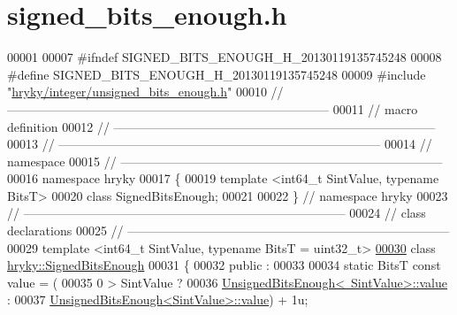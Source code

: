 \hypertarget{signed__bits__enough_8h_source}{\section{signed\-\_\-bits\-\_\-enough.\-h}
}

\begin{DoxyCode}
00001 
00007 \textcolor{preprocessor}{#ifndef SIGNED\_BITS\_ENOUGH\_H\_20130119135745248}
00008 \textcolor{preprocessor}{}\textcolor{preprocessor}{#define SIGNED\_BITS\_ENOUGH\_H\_20130119135745248}
00009 \textcolor{preprocessor}{}\textcolor{preprocessor}{#include "\hyperlink{unsigned__bits__enough_8h}{hryky/integer/unsigned_bits_enough.h}"}
00010 \textcolor{comment}{//
      ------------------------------------------------------------------------------}
00011 \textcolor{comment}{// macro definition}
00012 \textcolor{comment}{//
      ------------------------------------------------------------------------------}
00013 \textcolor{comment}{//
      ------------------------------------------------------------------------------}
00014 \textcolor{comment}{// namespace}
00015 \textcolor{comment}{//
      ------------------------------------------------------------------------------}
00016 \textcolor{keyword}{namespace }hryky
00017 \{
00019     \textcolor{keyword}{template} <\textcolor{keywordtype}{int}64\_t S\textcolor{keywordtype}{int}Value, \textcolor{keyword}{typename} BitsT>
00020     \textcolor{keyword}{class }SignedBitsEnough;
00021 
00022 \} \textcolor{comment}{// namespace hryky}
00023 \textcolor{comment}{//
      ------------------------------------------------------------------------------}
00024 \textcolor{comment}{// class declarations}
00025 \textcolor{comment}{//
      ------------------------------------------------------------------------------}
00029 \textcolor{comment}{}\textcolor{keyword}{template} <\textcolor{keywordtype}{int}64\_t S\textcolor{keywordtype}{int}Value, \textcolor{keyword}{typename} BitsT = u\textcolor{keywordtype}{int}32\_t>
\hypertarget{signed__bits__enough_8h_source_l00030}{}\hyperlink{classhryky_1_1_signed_bits_enough}{00030} \textcolor{keyword}{class }\hyperlink{classhryky_1_1_signed_bits_enough}{hryky::SignedBitsEnough}
00031 \{
00032 \textcolor{keyword}{public} :
00033 
00034     \textcolor{keyword}{static} BitsT \textcolor{keyword}{const} value = (
00035         0 > SintValue ?
00036         \hyperlink{classhryky_1_1_unsigned_bits_enough}{UnsignedBitsEnough<~SintValue>::value} :
00037         \hyperlink{classhryky_1_1_unsigned_bits_enough}{UnsignedBitsEnough<SintValue>::value}) + 1u;

\end{DoxyCode}
